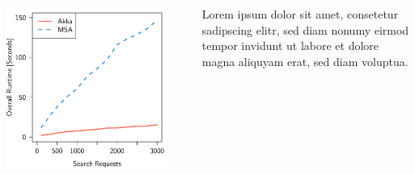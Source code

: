 \documentclass[final,hyperref={pdfpagelabels=true}]{beamer}
\begin{document}
\begin{frame}
\begin{columns}[t]
\begin{column}{.45\textwidth}
      \begin{columns}[t]
        \begin{column}{.4\textwidth}
          \includegraphics[width=1\textwidth]{graphics/eval-search-rtt-overall.pdf}
        \end{column}
        \begin{column}{.05\textwidth}
        \end{column}
        \begin{column}{.55\textwidth}
          {\lmodern
            Lorem ipsum dolor sit amet, consetetur sadipscing elitr, sed diam nonumy eirmod tempor invidunt ut labore et dolore magna aliquyam erat, sed diam voluptua.
          }
        \end{column}
      \end{columns}


    \end{column}
  \end{columns}

\end{frame}
\end{document}
